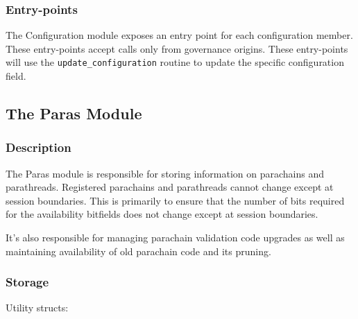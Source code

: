 \subsubsection{Entry-points}

The Configuration module exposes an entry point for each configuration member.
These entry-points accept calls only from governance origins. These entry-points
will use the \verb|update_configuration| routine to update the specific
configuration field.

\subsection{The Paras Module}

\subsubsection{Description}

The Paras module is responsible for storing information on parachains and
parathreads. Registered parachains and parathreads cannot change except at
session boundaries. This is primarily to ensure that the number of bits required
for the availability bitfields does not change except at session boundaries.
\newline

It's also responsible for managing parachain validation code upgrades as well as
maintaining availability of old parachain code and its pruning.

\subsubsection{Storage}

Utility structs:

